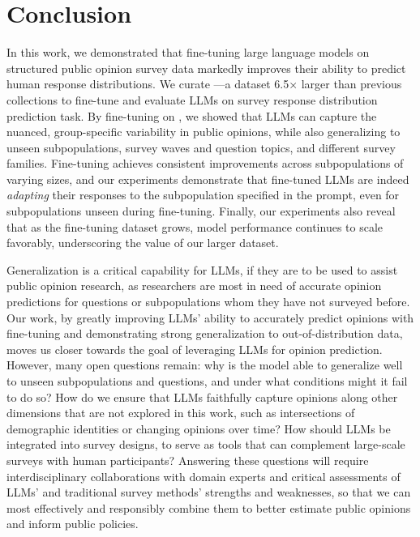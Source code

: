 \section{Conclusion}
\vspace{-10pt}
In this work, we demonstrated that fine-tuning large language models on structured public opinion survey data markedly improves their ability to predict human response distributions. 
We curate \OURDATA—a dataset 6.5× larger than previous collections to fine-tune and evaluate LLMs on survey response distribution prediction task.
By fine-tuning on \OURDATA, we showed that LLMs can capture the nuanced, group-specific variability in public opinions, while also generalizing to unseen subpopulations, survey waves and question topics, and different survey families. 
Fine-tuning achieves consistent improvements across subpopulations of varying sizes, and our experiments demonstrate that fine-tuned LLMs are indeed \textit{adapting} their responses to the subpopulation specified in the prompt, even for subpopulations unseen during fine-tuning. 
Finally, our experiments also reveal that as the fine-tuning dataset grows, model performance continues to scale favorably, underscoring the value of our larger dataset. 

Generalization is a critical capability for LLMs, if they are to be used to assist public opinion research, as researchers are most in need of accurate opinion predictions for questions or subpopulations whom they have not surveyed before.
Our work, by greatly improving LLMs' ability to accurately predict opinions with fine-tuning and demonstrating strong generalization to out-of-distribution data, moves us closer towards the goal of leveraging LLMs for opinion prediction.
However, many open questions remain: 
why is the model able to generalize well to unseen subpopulations and questions, and under what conditions might it fail to do so?
How do we ensure that LLMs faithfully capture opinions along other dimensions that are not explored in this work, such as intersections of demographic identities or changing opinions over time? 
How should LLMs be integrated into survey designs, to serve as tools that can complement large-scale surveys with human participants? 
Answering these questions will require interdisciplinary collaborations with domain experts and critical assessments of LLMs' and traditional survey methods' strengths and weaknesses, so that we can most effectively and responsibly combine them to better estimate public opinions and inform public policies.